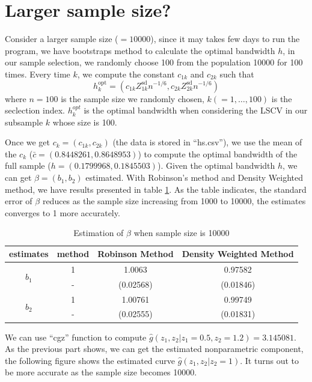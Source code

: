 \documentclass{article}
\begin{document}
\section{Larger sample size?}
Consider a larger sample size ($=10000$), since it may takes few days to run the program, we have bootstraps method to calculate the optimal bandwidth $h$, in our sample selection, we randomly choose 100 from the population 10000 for 100 times. Every time $k$, we compute the constant $c_{1k}$ and $c_{2k}$ such that
\begin{equation}
h^{\text{opt}}_{k} = (c_{1k} Z^{\text{sd}}_{1k}n^{-1/6} , c_{2k} Z^{\text{sd}}_{2k}n^{-1/6})
\end{equation}
where $n=100$ is the sample size we randomly chosen, $k(=1,\ldots,100)$ is the seclection index. $h^{opt}_{k}$ is the optimal bandwidth when considering the LSCV in our subsample $k$ whose size is 100.

Once we get $c_{k}=(c_{1k},c_{2k})$ (the data is stored in ``hs.csv''), we use the mean of the $c_{k}$ ($\bar{c}=(0.8448261, 0.8648953)$) to compute the optimal bandwidth of the full sample ($h=(0.1799968, 0.1845503)$). Given the optimal bandwidth $h$, we can get $\beta = (b_{1},b_{2})$ estimated. With Robinson\rq{}s method and Density Weighted method, we have results presented in table \ref{tab:fullsample10000}. As the table indicates, the standard error of $\beta$ reduces as the sample size increasing from 1000 to 10000, the estimates converges to 1 more accurately.
\begin{table}[htbp]
  \centering
  \caption{Estimation of $\beta$ when sample size is 10000}
    \begin{tabular}{cccc}
    \toprule
    estimates & method & Robinson Method & Density Weighted Method \\
    \midrule
    \multirow{2}[1]{*}{$b_{1}$} & 1     & 1.0063 & 0.97582 \\
          & -     & (0.02568) & (0.01846) \\
    \multirow{2}[1]{*}{$b_{2}$} & 1     & 1.00761 & 0.99749 \\
          & -     & (0.02555) & (0.01831) \\
    \bottomrule
    \end{tabular}%
  \label{tab:fullsample10000}%
\end{table}%
We can use ``cgz'' function to compute $\hat{g}(z_{1},z_{2}|z_{1}=0.5,z_{2}=1.2)=3.145081$. As the previous part shows, we can get the estimated nonparametric component, the following figure shows the estimated curve $\hat{g}(z_{1},z_{2}|z_{2}=1)$. It turns out to be more accurate as the sample size becomes 10000.
\end{document}
